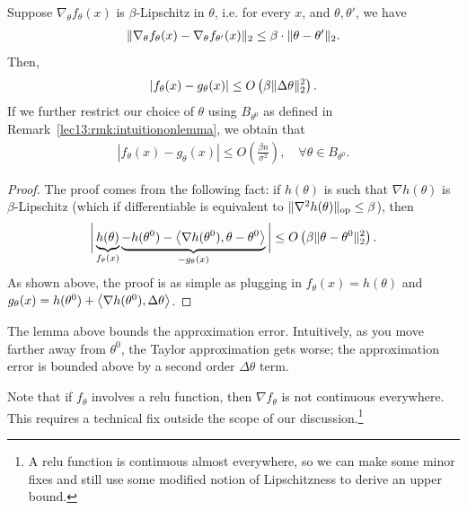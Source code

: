 \begin{lemma}[for (1)] 
    \label{lec13:lma:accurate_approximation}
    Suppose $\nabla_\theta f_\theta(x)$ is $\beta$-Lipschitz in $\theta$, i.e. for every $x$, and $\theta, \theta'$, we have 
    \begin{align}
        \|\nabla_\theta f_{\theta} (x) - \nabla_{\theta} f_{\theta'}(x)\|_2 \leq \beta \cdot \| \theta - \theta'\|_2.
    \end{align} 
    Then, 
    \begin{align} 
        \left| f_\theta(x) - g_\theta(x) \right| \leq O \left( \beta \|\Delta \theta\|_2^2 \right).
    \end{align}  
    If we further restrict our choice of $\theta$ using $B_{\theta^0}$ as defined in Remark~\ref{lec13:rmk:intuitiononlemma}, we obtain that
    \begin{align} 
        | f_\theta(x) - g_\theta(x) | \leq O \left( \frac{\beta n }{\sigma^2 }\right), \quad \forall \theta \in B_{\theta^0}. \label{lec13:eqn:lemma1bound} 
    \end{align} 
\end{lemma}
\begin{proof}
    The proof comes from the following fact:  if $h(\theta)$ is such that $\nabla h(\theta)$ is $\beta$-Lipschitz (which if differentiable is equivalent to $\|\nabla^2 h(\theta)\|_{\text{op}} \leq \beta$), then
    \begin{align}
        \bigg| \underbrace{h(\theta)}_{f_\theta(x)}  \underbrace{-h(\theta^0) - \left\langle\nabla h(\theta^0), \theta-\theta^0\right\rangle}_{-g_\theta(x)}\bigg| \leq O\left( \beta \|\theta-\theta^0\|_2^2 \right).
    \end{align} 
    As shown above, the proof is as simple as plugging in $f_\theta(x) = h(\theta)$ and $g_\theta(x)=h(\theta^0) + \left\langle\nabla h(\theta^0), \Delta \theta\right\rangle$. 
\end{proof}

\begin{remark}
The lemma above bounds the approximation error. Intuitively, as you move farther away from $\theta^0$, the Taylor approximation gets worse; the approximation error is bounded above by a second order $\Delta \theta$ term.
\end{remark}

\begin{remark}
Note that if $f_\theta$ involves a $\text{relu}$ function, then $\nabla f_\theta$ is not continuous everywhere. This requires a technical fix outside the scope of our discussion.\footnote{A $\text{relu}$ function is continuous almost everywhere, so we can make some minor fixes and still use some modified notion of Lipschitzness to derive an upper bound.} 
\end{remark}

